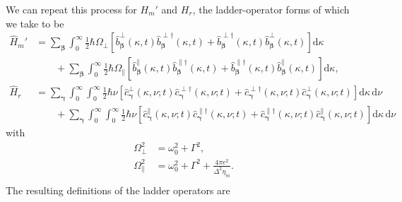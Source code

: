 \documentclass{article}
\begin{document}
We can repeat this process for $H_m'$ and $H_r$, the ladder-operator forms of which we take to be
\begin{equation}
\begin{split}
\hat{H}_m' &= \sum_{\bm{\beta}}\int_0^\infty\frac{1}{2}\hbar\Omega_\perp\left[\hat{b}_{\bm{\beta}}^\perp(\kappa,t)\hat{b}_{\bm{\beta}}^{\perp\dagger}(\kappa,t) + \hat{b}_{\bm{\beta}}^{\perp\dagger}(\kappa,t)\hat{b}_{\bm{\beta}}^\perp(\kappa,t)\right]\mathrm{d}\kappa\\
&\qquad + \sum_{\bm{\beta}}\int_0^\infty\frac{1}{2}\hbar\Omega_\parallel\left[\hat{b}_{\bm{\beta}}^\parallel(\kappa,t)\hat{b}_{\bm{\beta}}^{\parallel\dagger}(\kappa,t) + \hat{b}_{\bm{\beta}}^{\parallel\dagger}(\kappa,t)\hat{b}_{\bm{\beta}}^\parallel(\kappa,t)\right]\mathrm{d}\kappa,\\[0.5em]
\hat{H}_r &= \sum_{\bm{\gamma}}\int_0^\infty\int_0^\infty\frac{1}{2}\hbar\nu\left[\hat{c}_{\bm{\gamma}}^\perp(\kappa,\nu;t)\hat{c}_{\bm{\gamma}}^{\perp\dagger}(\kappa,\nu;t) + \hat{c}_{\bm{\gamma}}^{\perp\dagger}(\kappa,\nu;t)\hat{c}_{\bm{\gamma}}^\perp(\kappa,\nu;t)\right]\mathrm{d}\kappa\,\mathrm{d}\nu\\
&\qquad + \sum_{\bm{\gamma}}\int_0^\infty\int_0^\infty\frac{1}{2}\hbar\nu\left[\hat{c}_{\bm{\gamma}}^\parallel(\kappa,\nu;t)\hat{c}_{\bm{\gamma}}^{\parallel\dagger}(\kappa,\nu;t) + \hat{c}_{\bm{\gamma}}^{\parallel\dagger}(\kappa,\nu;t)\hat{c}_{\bm{\gamma}}^\parallel(\kappa,\nu;t)\right]\mathrm{d}\kappa\,\mathrm{d}\nu
\end{split}
\end{equation}
with
\begin{equation}
\begin{split}
\Omega_\perp^2 &= \omega_0^2 + \Gamma^2,\\
\Omega_\parallel^2 &= \omega_0^2 + \Gamma^2 + \frac{4\pi e^2}{\Delta^2\eta_m}.\\
\end{split}    
\end{equation}
The resulting definitions of the ladder operators are
\end{document}
